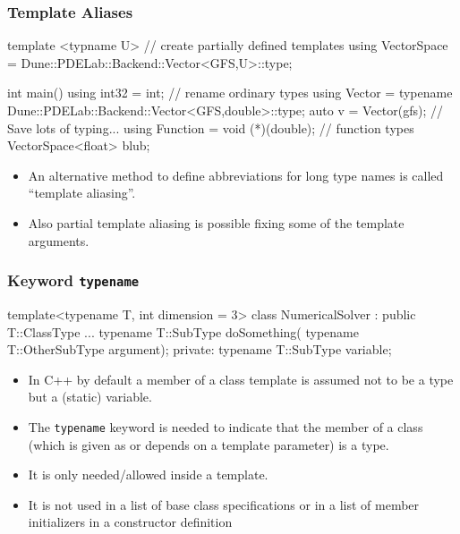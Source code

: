 \documentclass[aspectratio=169,ignorenonframetext,11pt]{beamer}
\def\inline{\lstinline[basicstyle=\small\ttfamily]}
\begin{document}
\begin{frame}[fragile]
\frametitle{Template Aliases}
\begin{cppcode}
template <typname U>    // create partially defined templates 
using VectorSpace = Dune::PDELab::Backend::Vector<GFS,U>::type;

int main()
{
  using int32 = int;                  // rename ordinary types
  using Vector = 
        typename Dune::PDELab::Backend::Vector<GFS,double>::type;
  auto v = Vector(gfs); // Save lots of typing...
  using Function = void (*)(double);  // function types
  VectorSpace<float> blub;
}
\end{cppcode}


\begin{itemize}
\item An alternative method to define abbreviations for long type names is called ``template aliasing''.
\item Also partial template aliasing is possible fixing some of the template arguments.
\end{itemize}

\end{frame}



\begin{frame}[fragile]
\frametitle{Keyword \texttt{typename}}
\begin{cppcode}
template<typename T, int dimension = 3>
class NumericalSolver : public T::ClassType
{
    ...
    typename T::SubType doSomething(
                          typename T::OtherSubType argument);
  private:
    typename T::SubType variable;
}
\end{cppcode}
\begin{itemize}%
\item In C++ by default a member of a class template is assumed not to be a type but
a (static) variable.
\item The \inline!typename! keyword is needed to
indicate that the member of a class (which is given as or depends on a template
parameter) is a type.
\item It is only needed/allowed inside a template.
\item It is not used in a list of base class specifications or in a list of member initializers
in a constructor definition
\end{itemize}

\end{frame}
\end{document}
